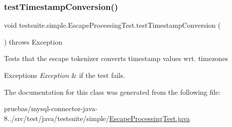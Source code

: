 \subsubsection{\texorpdfstring{test\+Timestamp\+Conversion()}{testTimestampConversion()}}
{\footnotesize\ttfamily void testsuite.\+simple.\+Escape\+Processing\+Test.\+test\+Timestamp\+Conversion (\begin{DoxyParamCaption}{ }\end{DoxyParamCaption}) throws Exception}

Tests that the escape tokenizer converts timestamp values wrt. timezones


\begin{DoxyExceptions}{Exceptions}
{\em Exception} & if the test fails. \\
\hline
\end{DoxyExceptions}


The documentation for this class was generated from the following file\+:\begin{DoxyCompactItemize}
\item 
pruebas/mysql-\/connector-\/java-\/8../src/test/java/testsuite/simple/\mbox{\hyperlink{_escape_processing_test_8java}{Escape\+Processing\+Test.\+java}}\end{DoxyCompactItemize}

